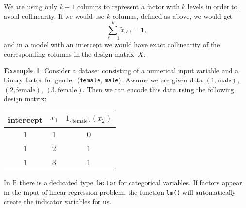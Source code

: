 \documentclass[
  a4paper,
]{article}
\theoremstyle{definition}
\theoremstyle{definition}
\newtheorem{example}{Example}[section]
\theoremstyle{definition}
\theoremstyle{definition}
\theoremstyle{remark}
\begin{document}
We are using only \(k-1\) columns to represent a factor
with \(k\) levels in order to avoid collinearity. If we would use \(k\) columns,
defined as above, we would get
\begin{equation*}
  \sum_{\ell=1}^k \tilde x_{\ell i}
  = \mathbf{1},
\end{equation*}
and in a model with an intercept we would have exact collinearity of
the corresponding columns in the design matrix~\(X\).

\begin{example}

Consider a dataset consisting of a numerical input variable
and a binary factor for gender (\texttt{female}, \texttt{male}).
Assume we are given data
\((1, \mathrm{male})\), \((2, \mathrm{female})\), \((3, \mathrm{female})\).
Then we can encode this data using the following design matrix:

\begin{longtable}[]{@{}ccc@{}}
\toprule
intercept & \(x_1\) & \(1_\mathrm{\{female\}}(x_2)\) \\
\midrule
\endhead
1 & 1 & 0 \\
1 & 2 & 1 \\
1 & 3 & 1 \\
\bottomrule
\end{longtable}

\end{example}

In R there is a dedicated type \texttt{factor} for categorical variables.
If factors appear in the input of linear regression problem, the
function \texttt{lm()} will automatically create the indicator variables
for us.
\end{document}
